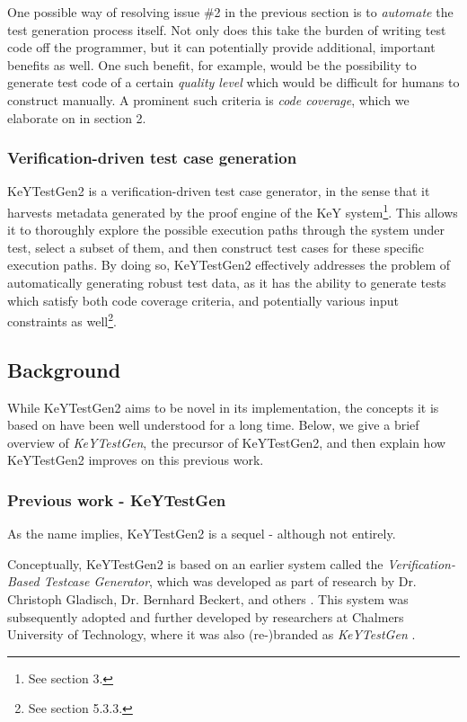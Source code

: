 \documentclass{article}
\newcommand{\tmem}[1]{{\em #1\/}}
\begin{document}
One possible way of resolving issue \#2 in the previous section is to
{\tmem{automate}} the test generation process itself. Not only does this take
the burden of writing test code off the programmer, but it can potentially
provide additional, important benefits as well. One such benefit, for example,
would be the possibility to generate test code of a certain {\tmem{quality
level}} which would be difficult for humans to construct manually. A prominent
such criteria is {\tmem{code coverage}}, which we elaborate on in section 2.



\subsubsection{Verification-driven test case generation}

KeYTestGen2 is a verification-driven test case generator, in the sense that it
harvests metadata generated by the proof engine of the KeY
system{\footnote{See section 3.}}. This allows it to thoroughly explore the
possible execution paths through the system under test, select a subset of
them, and then construct test cases for these specific execution paths. By
doing so, KeYTestGen2 effectively addresses the problem of automatically
generating robust test data, as it has the ability to generate tests which
satisfy both code coverage criteria, and potentially various input constraints
as well{\footnote{See section 5.3.3.}}. \

\subsection{Background}

While KeYTestGen2 aims to be novel in its implementation, the concepts it is
based on have been well understood for a long time. Below, we give a brief
overview of {\tmem{KeYTestGen}}, the precursor of KeYTestGen2, and then
explain how KeYTestGen2 improves on this previous work.



\subsubsection{Previous work - KeYTestGen}

As the name implies, KeYTestGen2 is a sequel - although not entirely.



Conceptually, KeYTestGen2 is based on an earlier system called the
{\tmem{Verification-Based Testcase Generator}}, which was developed as part of
research by Dr. Christoph Gladisch, Dr. Bernhard Beckert, and others
{\cite{EngelHaehnle07}}{\cite{Engel2006}}{\cite{BeckertGladisch2007}}{\cite{Gladisch2008_TAP}}{\cite{Gladisch2008}}.
This system was subsequently adopted and further developed by researchers at
Chalmers University of Technology, where it was also (re-)branded as
{\tmem{KeYTestGen}} {\cite{Paganelli2010}}.
\end{document}
